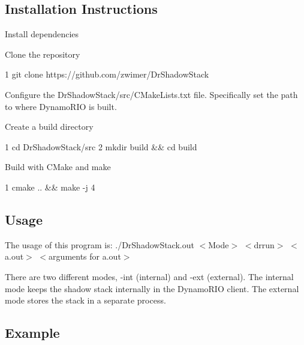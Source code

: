 \subsection*{Installation Instructions}


\begin{DoxyEnumerate}
\item Install dependencies
\item Clone the repository 
\begin{DoxyCode}
1 git clone https://github.com/zwimer/DrShadowStack
\end{DoxyCode}

\item Configure the {\ttfamily Dr\+Shadow\+Stack/src/\+C\+Make\+Lists.\+txt} file. Specifically set the path to where Dynamo\+R\+IO is built.
\item Create a build directory 
\begin{DoxyCode}
1 cd DrShadowStack/src
2 mkdir build && cd build
\end{DoxyCode}

\item Build with C\+Make and make 
\begin{DoxyCode}
1 cmake .. && make -j 4
\end{DoxyCode}

\end{DoxyEnumerate}

\subsection*{Usage}

The usage of this program is\+: {\ttfamily ./\+Dr\+Shadow\+Stack.out $<$Mode$>$ $<$drrun$>$ $<$a.\+out$>$ $<$arguments for a.\+out$>$}

There are two different modes, {\ttfamily -\/int} (internal) and {\ttfamily -\/ext} (external). The internal mode keeps the shadow stack internally in the Dynamo\+R\+IO client. The external mode stores the stack in a separate process.

\subsection*{Example}

